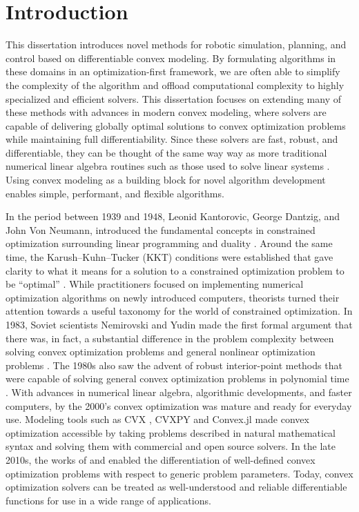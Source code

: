 \chapter{Introduction}

This dissertation introduces novel methods for robotic simulation, planning, and control based on differentiable convex modeling.
By formulating algorithms in these domains in an optimization-first framework, we are often able to simplify the complexity of the algorithm and offload computational complexity to highly specialized and efficient solvers.
This dissertation focuses on extending many of these methods with advances in modern convex modeling, where solvers are capable of delivering globally optimal solutions to convex optimization problems while maintaining full differentiability.
Since these solvers are fast, robust, and differentiable, they can be thought of the same way way as more traditional numerical linear algebra routines such as those used to solve linear systems \cite{boyd2004}.
Using convex modeling as a building block for novel algorithm development enables simple, performant, and flexible algorithms. 

In the period between 1939 and 1948, Leonid Kantorovic, George Dantzig, and John Von Neumann, introduced the fundamental concepts in constrained optimization surrounding linear programming and duality \cite{dantzig1990}.
Around the same time, the Karush–Kuhn–Tucker (KKT) conditions were established that gave clarity to what it means for a solution to a constrained optimization problem to be ``optimal'' \cite{boyd2004}.
While practitioners focused on implementing numerical optimization algorithms on newly introduced computers, theorists turned their attention towards a useful taxonomy for the world of constrained optimization.
In 1983, Soviet scientists Nemirovski and Yudin made the first formal argument that there was, in fact, a substantial difference in the problem complexity between solving convex optimization problems and general nonlinear optimization problems \cite{blair1985}.
The 1980s also saw the advent of robust interior-point methods that were capable of solving general convex optimization problems in polynomial time \cite{mehrotra1992}. 
With advances in numerical linear algebra, algorithmic developments, and faster computers, by the 2000's convex optimization was mature and ready for everyday use.
Modeling tools such as CVX \cite{grant}, CVXPY \cite{diamond} and Convex.jl \cite{udell2014} made convex optimization accessible by taking problems described in natural mathematical syntax and solving them with commercial and open source solvers. 
In the late 2010s, the works of \cite{amos2017} and \cite{agrawal2019} enabled the differentiation of well-defined convex optimization problems with respect to generic problem parameters.
Today, convex optimization solvers can be treated as well-understood and reliable differentiable functions for use in a wide range of applications. 

